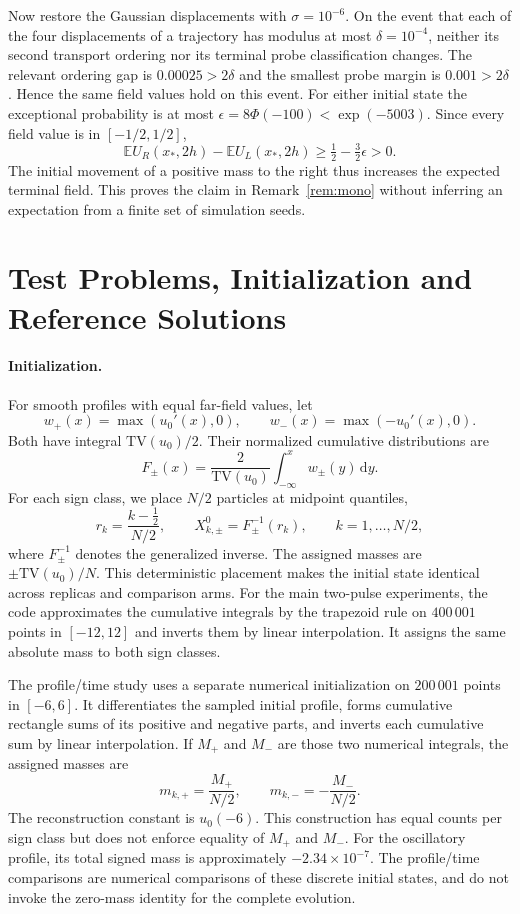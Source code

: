 \documentclass[smallextended,nospthms]{svjour3}
\theoremstyle{plain}
\theoremstyle{definition}
\theoremstyle{remark}
\numberwithin{equation}{section}
\newcommand{\E}{\mathbb{E}}
\begin{document}
Now restore the Gaussian displacements with $\sigma=10^{-6}$. On the event
that each of the four displacements of a trajectory has modulus at most
$\delta=10^{-4}$, neither its second transport ordering nor its terminal
probe classification changes. The relevant ordering gap is $0.00025>2\delta$
and the smallest probe margin is $0.001>2\delta$. Hence the same field values
hold on this event. For either initial state the exceptional probability is
at most $\epsilon=8\Phi(-100)<\exp(-5003)$. Since every field value is in
$[-1/2,1/2]$,
\[
 \E U_R(x_*,2h)-\E U_L(x_*,2h)\ge\tfrac12-\tfrac32\epsilon>0.
\]
The initial movement of a positive mass to the right thus increases the
expected terminal field. This proves the claim in Remark~\ref{rem:mono}
without inferring an expectation from a finite set of simulation seeds.

\section{Test Problems, Initialization and Reference Solutions}
\label{app:setup}

\paragraph{Initialization.}
For smooth profiles with equal far-field values, let
\[
 w_+(x)=\max(u_0'(x),0),\qquad
 w_-(x)=\max(-u_0'(x),0).
\]
Both have integral $\mathrm{TV}(u_0)/2$. Their normalized cumulative
distributions are
\[
 F_\pm(x)=\frac{2}{\mathrm{TV}(u_0)}\int_{-\infty}^x w_\pm(y)\,\mathrm dy.
\]
For each sign class, we place $N/2$ particles at midpoint quantiles,
\[
 r_k=\frac{k-\tfrac12}{N/2},\qquad
 X^0_{k,\pm}=F_\pm^{-1}(r_k),\qquad k=1,\ldots,N/2,
\]
where $F_\pm^{-1}$ denotes the generalized inverse. The assigned masses are
$\pm\mathrm{TV}(u_0)/N$. This deterministic placement makes the initial state
identical across replicas and comparison arms. For the main two-pulse
experiments, the code approximates the cumulative integrals by the trapezoid
rule on $400\,001$ points in $[-12,12]$ and inverts them by linear
interpolation. It assigns the same absolute mass to both sign classes.

The profile/time study uses a separate numerical initialization on
$200\,001$ points in $[-6,6]$. It differentiates the sampled initial profile,
forms cumulative rectangle sums of its positive and negative parts, and
inverts each cumulative sum by linear interpolation. If $M_+$ and $M_-$
are those two numerical integrals, the assigned masses are
\[
 m_{k,+}=\frac{M_+}{N/2},\qquad
 m_{k,-}=-\frac{M_-}{N/2}.
\]
The reconstruction constant is $u_0(-6)$. This construction has equal counts
per sign class but does not enforce equality of $M_+$ and $M_-$. For the
oscillatory profile, its total signed mass is approximately
$-2.34\times10^{-7}$. The profile/time comparisons are numerical comparisons
of these discrete initial states, and do not invoke the zero-mass identity
for the complete evolution.
\end{document}
